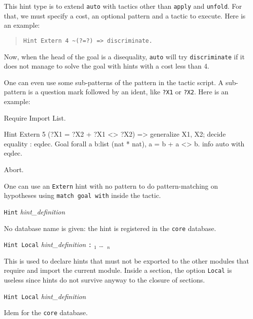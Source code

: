 \begin{itemize}
  This hint type is to extend \texttt{auto} with tactics other than
  \texttt{apply} and \texttt{unfold}. For that, we must specify a
  cost, an optional pattern and a tactic to execute. Here is an example:

\begin{quotation}
\begin{verbatim}
Hint Extern 4 ~(?=?) => discriminate.
\end{verbatim}
\end{quotation}

  Now, when the head of the goal is a disequality, \texttt{auto} will
  try \texttt{discriminate} if it does not manage to solve the goal
  with hints with a cost less than 4.
  
  One can even use some sub-patterns of the pattern in the tactic
  script. A sub-pattern is a question mark followed by an ident, like
  \texttt{?X1} or \texttt{?X2}. Here is an example:

\begin{coq_example*}
Require Import List.
\end{coq_example*}
\begin{coq_example}
Hint Extern 5   ({?X1 = ?X2} + {?X1 <> ?X2}) =>
 generalize X1, X2; decide equality : eqdec.
Goal 
forall a b:list (nat * nat), {a = b} + {a <> b}.
info auto with eqdec.
\end{coq_example}
\begin{coq_eval}
Abort.
\end{coq_eval}

\end{itemize}

\Rem One can use an \texttt{Extern} hint with no pattern to do
pattern-matching on hypotheses using \texttt{match goal with} inside 
the tactic.

\begin{Variants}
\item \texttt{Hint} \textsl{hint\_definition} 
  
  No database name is given: the hint is registered in the {\tt core} 
    database. 

\item\texttt{Hint Local} \textsl{hint\_definition} \texttt{:}
   \ident$_1$ \ldots\ \ident$_n$

  This is used to declare hints that must not be exported to the other
  modules that require and import the current module. Inside a
  section, the option {\tt Local} is useless since hints do not
  survive anyway to the closure of sections.

\item\texttt{Hint Local} \textsl{hint\_definition} 

  Idem for the {\tt core} database.
    
\end{Variants}

